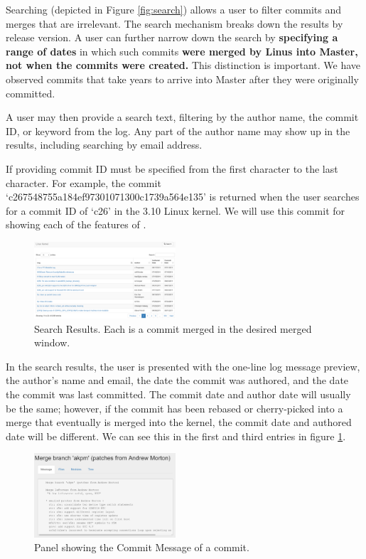 \documentclass[conference, draftclsnofoot, draft]{IEEEtran}
\begin{document}
Searching (depicted in Figure \ref{fig:search}) allows a user to filter commits and merges that are irrelevant. The search mechanism breaks down the results by
release version.  A user can further narrow down the search by \textbf{specifying a range of dates} in which such commits \textbf{were merged by Linus into
        Master, not
        when the commits were created.} This distinction is important. We have observed commits that take years
to arrive into Master after they were originally committed. 

A user may then provide a search text, filtering by the author name,
the commit ID, or keyword from the log. Any part of the author name may show up in
the results, including searching by email address. 

If providing commit ID must be specified
from the first character to the last character. For example, the commit
`c267548755a184ef97301071300c1739a564e135' is returned when the user searches for a
commit ID of `c26' in the 3.10 Linux kernel. We will use this commit for showing
each of the features of \tool.

\begin{figure}
        \centering
        \includegraphics[width=0.47\textwidth]{figures/search_results_2.png}
        \caption{Search Results. Each is a commit merged in the desired merged window.}
        \label{fig:results}
\end{figure}

In the search results, the user is presented with the one-line log message preview,
the author's name and email, the date the commit was authored, and the date the
commit was last committed. The commit date and author date will usually be the same;
however, if the commit has been rebased or cherry-picked into a merge that
eventually is merged into the kernel, the commit date and authored date will be
different. We can see this in the first and third entries in figure
\ref{fig:results}.

\begin{figure}
        \centering
        \includegraphics[width=0.47\textwidth]{figures/log_view.png}
        \caption{Panel showing the Commit Message of a commit.}
        \label{fig:message}
\end{figure}
\end{document}
